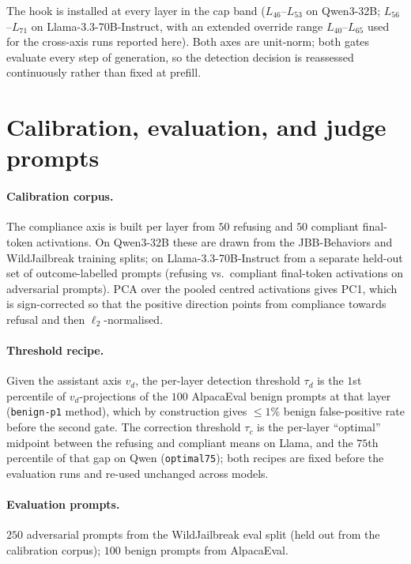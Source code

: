 \documentclass{article}
\begin{document}
The hook is installed at every layer in the cap band
($L_{46}$--$L_{53}$ on Qwen3-32B; $L_{56}$--$L_{71}$ on
Llama-3.3-70B-Instruct, with an extended override range
$L_{40}$--$L_{65}$ used for the cross-axis runs reported here). Both
axes are unit-norm; both gates evaluate every step of generation, so
the detection decision is reassessed continuously rather than fixed at
prefill.

\section{Calibration, evaluation, and judge prompts}
\label{app:prompts}

\paragraph{Calibration corpus.}
The compliance axis is built per layer from $50$ refusing and $50$
compliant final-token activations. On Qwen3-32B these are drawn from
the JBB-Behaviors and WildJailbreak training splits; on
Llama-3.3-70B-Instruct from a separate held-out set of
outcome-labelled prompts (refusing vs.\ compliant final-token
activations on adversarial prompts). PCA over the pooled centred
activations gives PC1, which is sign-corrected so that the positive
direction points from compliance towards refusal and then
$\ell_2$-normalised.

\paragraph{Threshold recipe.}
Given the assistant axis $v_d$, the per-layer detection threshold
$\tau_d$ is the $1$st percentile of $v_d$-projections of the $100$
AlpacaEval benign prompts at that layer (\texttt{benign-p1} method),
which by construction gives $\le 1\%$ benign false-positive rate before
the second gate. The correction threshold $\tau_c$ is the per-layer
``optimal'' midpoint between the refusing and compliant means on
Llama, and the $75$th percentile of that gap on Qwen
(\texttt{optimal75}); both recipes are fixed before the evaluation runs
and re-used unchanged across models.

\paragraph{Evaluation prompts.}
$250$ adversarial prompts from the WildJailbreak eval split (held out
from the calibration corpus); $100$ benign prompts from AlpacaEval.
\end{document}

